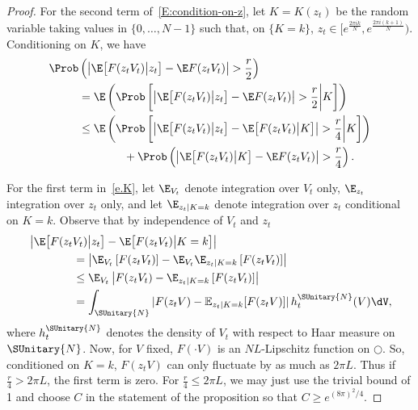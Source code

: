 \begin{proof}
For the second term of~\eqref{E:condition-on-z}, let $K=K(z_t)$ be the random variable taking values in $\{0,\ldots,N-1\}$ such that, on $\{K=k\}$, $z_t\in [e^{\frac{2\pi ik}{N}},e^{\frac{2\pi i(k+1)}{N}})$. Conditioning on $K$, we have
\begin{align}
\notag\Prob&\left(\left|\E\big[F(z_tV_t)\big|z_t\big]-\E F(z_tV_t)\right|>\frac{r}{2}\right)\\
&\notag=\E\left(\Prob\left[\left|\E\big[F(z_tV_t)\big|z_t\big] -\E F(z_tV_t)\right|>\frac{r}{2}\bigg|K\right]\right)\\
&\label{e.K}
\le\E\left(\Prob\left[\left|\E\big[F(z_tV_t)\big|z_t\big] -\E \big[F(z_tV_t)\big|K\big]\right|>\frac{r}{4}\bigg|K\right]\right)\\
&\notag\qquad\qquad+\Prob\left(\left|\E\big[F(z_tV_t)\big|K\big] -\E F(z_tV_t)\right|>\frac{r}{4}\right).
\end{align}

For the first term in~\eqref{e.K}, let $\E_{V_t}$ denote integration over $V_t$ only, $\E_{z_t}$ integration over $z_t$ only, and let $\E_{z_t|K=k}$ denote integration over $z_t$ conditional on $K=k$. Observe that by independence of $V_t$ and $z_t$
\begin{align*}
&\left|\E\big[F(z_tV_t)\big|z_t\big] -\E \big[F(z_tV_t)\big|K=k\big]\right|\\&\qquad\qquad=\left|\E_{V_t}\left[F(z_tV_t)\right]-\E_{V_t}\E_{z_t|K=k}\left[F(z_tV_t)\right]\right|\\&\qquad\qquad\le\E_{V_t}\left|F(z_tV_t)-\E_{z_t|K=k}\left[F(z_tV_t)\right]\right| \\
&\qquad\qquad= \int_{\SUnitary{N}} |F(z_tV) - \mathbb{E}_{z_t|K=k}[F(z_t V)]| \,h^{\SUnitary{N}}_t(V)\dV,
\end{align*}
where $h^{\SUnitary{N}}_t$ denotes the density of $V_t$ with respect to Haar measure on $\SUnitary{N}$. Now, for $V$ fixed, $F(\cdot V)$ is an $NL$-Lipschitz function on $\Circle$. So, conditioned on $K=k$, $F(z_tV)$ can only fluctuate by as much as $2\pi L$. Thus if $\frac{r}{4}>2\pi L$, the first term is zero. For $\frac{r}{4}\le2\pi L$, we may just use the trivial bound of 1 and choose $C$ in the statement of the proposition so that $C\ge e^{(8\pi)^2/4}$.


\end{proof}
